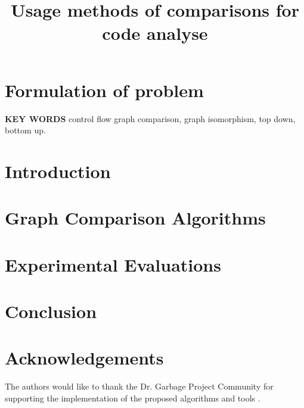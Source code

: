 \documentclass[twocolumn,letterpaper,10pt]{article}
\begin{document}
\date{}

\title{Usage methods of comparisons for code analyse }

%



\maketitle
\thispagestyle{empty}

\section{Formulation of problem}


%   
   
\noindent
{\bf\normalsize KEY WORDS}\newline
{control flow graph comparison, graph isomorphism, top down, bottom up.}

\section{Introduction}



%

\section{Graph Comparison Algorithms}


\section{\label{experimental_results}Experimental Evaluations}


\section{Conclusion} 


\section{Acknowledgements} 
The authors would like to thank the Dr. Garbage Project Community for supporting the implementation of the proposed algorithms and tools \cite{drgarbage_project}.


\end{document}
